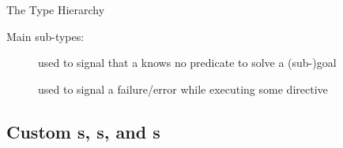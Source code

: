 \documentclass[handout]{beamer}
\begin{document}
\begin{frame}{The  Type Hierarchy}

    Main sub-types:
    \bigskip
    \begin{description}
        \item[] used to signal that a  knows no predicate to solve a (sub-)goal

        \bigskip

        \item[] used to signal a failure/error while executing some \alert{directive}
    \end{description}
\end{frame}

\subsection{Custom s, s, and s}
\end{document}
